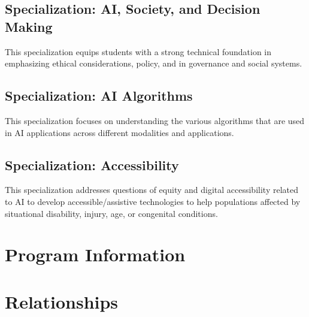 \documentclass[
10pt, %
a4paper, %
oneside, %
headinclude,footinclude, %
BCOR5mm, %
]{scrartcl}
\begin{document}
  

\subsection{Specialization: AI, Society, and Decision Making}

This specialization equips students with a strong technical foundation
in \ai{} emphasizing ethical considerations, policy, and \ai{} in
governance and social systems.  



\subsection{Specialization: AI Algorithms}

This specialization focuses on understanding the various algorithms that are used in AI applications across different modalities and applications.



\subsection{Specialization: Accessibility}

This specialization addresses questions of equity and digital accessibility related to AI to develop accessible/assistive technologies to help populations affected by situational disability, injury, age, or congenital conditions.





%


\section{Program Information}




\section{Relationships}
\end{document}
